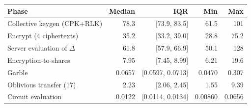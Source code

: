\begin{tabular}{lrrrr}
\hline
Phase & Median & IQR & Min & Max \\
\hline
Collective keygen (CPK+RLK) & 78.3 & [73.9, 83.5] & 61.5 & 101 \\
Encrypt (4 ciphertexts) & 35.2 & [33.2, 39.0] & 28.8 & 75.2 \\
Server evaluation of $\Delta$ & 61.8 & [57.9, 66.9] & 50.1 & 128 \\
Encryption-to-shares & 7.95 & [7.45, 8.99] & 6.21 & 19.6 \\
Garble & 0.0657 & [0.0597, 0.0713] & 0.0470 & 0.307 \\
Oblivious transfer (17) & 2.23 & [2.06, 2.45] & 1.55 & 9.39 \\
Circuit evaluation & 0.0122 & [0.0114, 0.0134] & 0.00860 & 0.0656 \\
\hline
\end{tabular}
